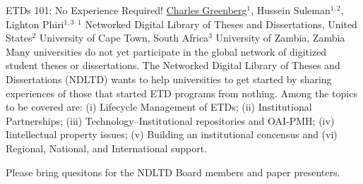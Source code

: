 
    \begin{abstract_online}{ETDs 101: No Experience Required!}{%
        \underline{Charles Greenberg}$^{1}$, Hussein Suleman$^{1,2}$, Lighton Phiri$^{1,3}$}{%
        }{%
        $^1$ Networked Digital Library of Theses and Dissertations, United States\newline{}$^2$ University of Cape Town, South Africa\newline{}$^3$ University of Zambia, Zambia}
        Many universities do not yet participate in the global network of digitized student theses or dissertations. The Networked Digital Library of Theses and Dissertations (NDLTD) wants to help universities to get started by sharing experiences of those that started ETD programs from nothing.  Among the topics to be covered are: (i) Lifecycle Management of ETDs; (ii) Institutional Partnerships; (iii) Technology--Institutional repositories and OAI-PMH; (iv) Iintellectual property issues; (v) Building an institutional concensus and (vi) Regional, National, and International support.

        Please bring quesitons for the NDLTD Board members and paper presenters.
    
    \end{abstract_online}
    
